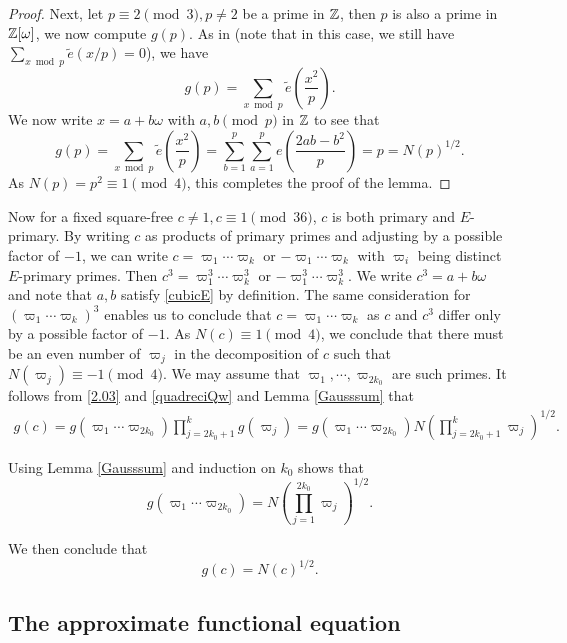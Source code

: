 \documentclass[twoside,leqno,10pt, A4]{amsart}
\begin{document}
\begin{proof}
   Next, let $p \equiv 2 \pmod 3, p \neq 2$ be a prime in $\mathbb Z$, then $p$ is also a prime in $\mathbb Z[\omega]$, we now compute $g(p)$. As in \cite[Chap. 2]{Da} (note that in this case, we still have $\sum_{x \bmod p}\tilde{e}(x/p)=0$), we have
\begin{equation*}
  g(p) =  \sum_{x \bmod{p}}\tilde{e} \left( \frac {x^2}p \right).
\end{equation*}
   We now write $x=a+b\omega$ with $a, b \pmod p$ in $\mathbb Z$ to see that
\begin{equation*}
  g(p) =  \sum_{x \bmod{p}}\tilde{e} \left( \frac {x^2}p \right)=\sum^p_{b=1}\sum^p_{a=1}e \left( \frac {2ab-b^2}{p} \right)=p=N(p)^{1/2}.
\end{equation*}
  As $N(p)=p^2 \equiv 1 \pmod 4$, this completes the proof of the lemma.
\end{proof}

Now for a fixed square-free $c \neq 1, c \equiv 1 \pmod {36}$, $c$ is both primary and $E$-primary. By writing $c$ as products of primary primes and adjusting by a possible factor of $-1$, we can write $c=\varpi_1\cdots \varpi_k$ or $-\varpi_1\cdots \varpi_k$ with $\varpi_i$ being distinct $E$-primary primes. Then $c^3=\varpi^3_1\cdots \varpi^3_k$ or $-\varpi^3_1\cdots \varpi^3_k$. We write $c^3=a+b\omega$ and note that $a,b$ satisfy \eqref{cubicE} by definition.  The same consideration for $(\varpi_1\cdots \varpi_k)^3$ enables us to conclude that $c=\varpi_1\cdots \varpi_k$ as $c$ and $c^3$ differ only by a possible factor of $-1$. As $N(c) \equiv 1 \pmod 4$, we conclude that there must be an even number of $\varpi_j$ in the decomposition of $c$ such that $N(\varpi_j) \equiv -1 \pmod 4$. We may assume that $\varpi_1, \cdots, \varpi_{2k_0}$ are such primes. It follows from \eqref{2.03} and \eqref{quadreciQw} and Lemma \ref{Gausssum} that
\begin{align*}
  g(c)=  g(\varpi_1\cdots \varpi_{2k_0}) \prod^k_{j=2k_0+1}g(\varpi_j)=g(\varpi_1\cdots \varpi_{2k_0}) N \left( \prod^k_{j=2k_0+1}\varpi_j \right)^{1/2}.
\end{align*}

   Using Lemma \ref{Gausssum} and induction on $k_0$ shows that
\[  g(\varpi_1\cdots \varpi_{2k_0})=N \left( \prod^{2k_0}_{j=1}\varpi_j \right)^{1/2}. \]

   We then conclude that
\begin{equation} \label{gcvalueQomega}
  g(c)= N(c)^{1/2}.
\end{equation}

\subsection{The approximate functional equation}
\end{document}
